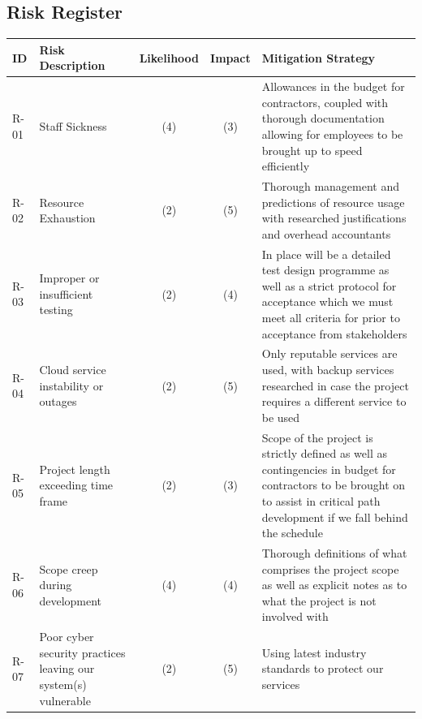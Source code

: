\documentclass{article}
\begin{document}
\subsection{Risk Register}
\begin{table}[h]
\centering
\begin{tabular}{|l|p{4cm}|c|c|p{8cm}|}
\hline
\textbf{ID} & \textbf{Risk Description} & \textbf{Likelihood} & \textbf{Impact} & \textbf{Mitigation Strategy} \\
\hline
R-01 & Staff Sickness & (4) & (3) & Allowances in the budget for contractors, coupled with thorough documentation allowing for employees to be brought up to speed efficiently \\

\hline

R-02 & Resource Exhaustion & (2) & (5) & Thorough management and predictions of resource usage with researched justifications and overhead accountants \\

\hline

R-03 & Improper or insufficient testing & (2) & (4) & In place will be a detailed test design programme as well as a strict protocol for acceptance which we must meet all criteria for prior to acceptance from stakeholders \\

\hline

R-04 & Cloud service instability or outages & (2) & (5) & Only reputable services are used, with backup services researched in case the project requires a different service to be used \\

\hline

R-05 & Project length exceeding time frame & (2) & (3) & Scope of the project is strictly defined as well as contingencies in budget for contractors to be brought on to assist in critical path development if we fall behind the schedule \\

\hline

R-06 & Scope creep during development & (4) & (4) & Thorough definitions of what comprises the project scope as well as explicit notes as to what the project is not involved with \\

\hline

R-07 & Poor cyber security practices leaving our system(s) vulnerable & (2) & (5) & Using latest industry standards to protect our services \\


\end{tabular}
\end{table}
\end{document}
